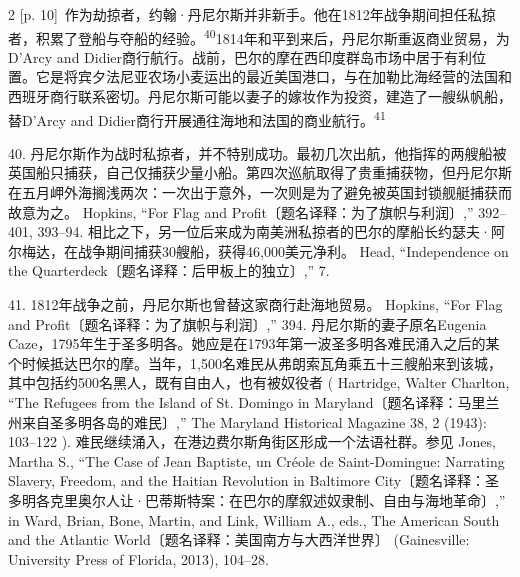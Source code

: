 \documentclass[10pt,a4paper]{article}
\begin{document}
\begin{paracol}{2}
{\scriptsize\color{gray} [p. 10]}\ 作为劫掠者，约翰·丹尼尔斯并非新手。他在1812年战争期间担任私掠者，积累了登船与夺船的经\mbox{验。\textsuperscript{40}}1814年和平到来后，丹尼尔斯重返商业贸易，为D’Arcy and Didier商行航行。战前，巴尔的摩在西印度群岛市场中居于有利位置。它是将宾夕法尼亚农场小麦运出的最近美国港口，与在加勒比海经营的法国和西班牙商行联系密切。丹尼尔斯可能以妻子的嫁妆作为投资，建造了一艘纵帆船，替D’Arcy and Didier商行开展通往海地和法国的商业航\mbox{行。\textsuperscript{41}}\par{\small 40. 丹尼尔斯作为战时私掠者，并不特别成功。最初几次出航，他指挥的两艘船被英国船只捕获，自己仅捕获少量小船。第四次巡航取得了贵重捕获物，但丹尼尔斯在五月岬外海搁浅两次：一次出于意外，一次则是为了避免被英国封锁舰艇捕获而故意为之。 Hopkins, “For Flag and Profit〔题名译释：为了旗帜与利润〕,” 392–401, 393–94. 相比之下，另一位后来成为南美洲私掠者的巴尔的摩船长约瑟夫·阿尔梅达，在战争期间捕获30艘船，获得46,000美元净利。 Head, “Independence on the Quarterdeck〔题名译释：后甲板上的独立〕,” 7.\par}{\small 41. 1812年战争之前，丹尼尔斯也曾替这家商行赴海地贸易。 Hopkins, “For Flag and Profit〔题名译释：为了旗帜与利润〕,” 394. 丹尼尔斯的妻子原名Eugenia Caze，1795年生于圣多明各。她应是在1793年第一波圣多明各难民涌入之后的某个时候抵达巴尔的摩。当年，1,500名难民从弗朗索瓦角乘五十三艘船来到该城，其中包括约500名黑人，既有自由人，也有被奴役者 ( Hartridge, Walter Charlton, “The Refugees from the Island of St. Domingo in Maryland〔题名译释：马里兰州来自圣多明各岛的难民〕,” The Maryland Historical Magazine 38, 2 (1943): 103–122 ). 难民继续涌入，在港边费尔斯角街区形成一个法语社群。参见 Jones, Martha S., “The Case of Jean Baptiste, un Créole de Saint-Domingue: Narrating Slavery, Freedom, and the Haitian Revolution in Baltimore City〔题名译释：圣多明各克里奥尔人让·巴蒂斯特案：在巴尔的摩叙述奴隶制、自由与海地革命〕,” in Ward, Brian, Bone, Martin, and Link, William A., eds., The American South and the Atlantic World〔题名译释：美国南方与大西洋世界〕 (Gainesville: University Press of Florida, 2013), 104–28.\par}
\switchcolumn

\end{paracol}
\end{document}
